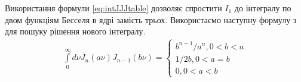 %

Використання формули \eqref{eq:intJJJtable} дозволяє спростити $ I_1 $ до 
інтегралу по двом функціям Бесселя в ядрі замість трьох. Використаємо наступну 
формулу з \cite{imp:Golubovic2013} для пошуку рішення нового інтегралу. 
%
\begin{equation} \begin{aligned} \label{eq:intJJtable}
\int\limits_{0}^{\infty} d \nu
J_n \left( a \nu \right) J_{n-1} \left( b \nu \right) = \begin{cases} 
b^{n-1} / a^n , 0 < b < a \\
1 / 2 b , 0 < a = b \\
0 , 0 < a < b
\end{cases} 
\end{aligned} \end{equation}
%
%
